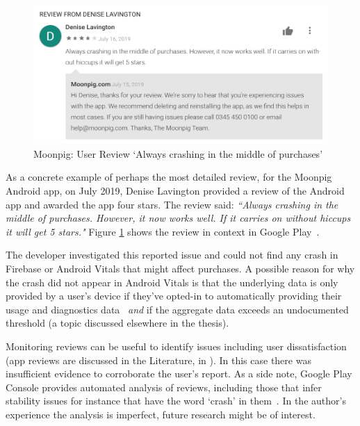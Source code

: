 \begin{figure}
    \centering
    \includegraphics[width=\linewidth]{images/google-play/Denise-Lavington-Review-moonpig-crashing-2019.png}
    \caption[Moonpig: User Review in Google Play `Always crashes...']{Moonpig: User Review `Always crashing in the middle of purchases'}
    \label{fig:gp-review-denise-lavington-always-crashes}
\end{figure}

As a concrete example of perhaps the most detailed review, for the Moonpig Android app, on  July 2019, Denise Lavington provided a review of the Android app and awarded the app four stars. The review said: \emph{``Always crashing in the middle of purchases. However, it now works well. If it carries on without hiccups it will get 5 stars."} Figure \ref{fig:gp-review-denise-lavington-always-crashes} shows the review in context in Google Play~.

The developer investigated this reported issue and could not find any crash in Firebase or Android Vitals that might affect purchases. A possible reason for why the crash did not appear in Android Vitals is that the underlying data is only provided by a user's device if they've opted-in to automatically providing their usage and diagnostics data~ \textit{and} if the aggregate data exceeds an undocumented threshold (a topic discussed elsewhere in the thesis). 

Monitoring reviews can be useful to identify issues including user dissatisfaction (app reviews are discussed in the Literature, in ). In this case there was insufficient evidence to corroborate the user's report. As a side note, Google Play Console provides automated analysis of reviews, including those that infer stability issues for instance that have the word `crash' in them~. In the author's experience the analysis is imperfect, future research might be of interest.

